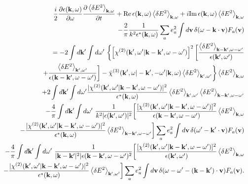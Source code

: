 \documentclass[10pt,aspectratio=1610,lualatex]{beamer}
\begin{document}
\begin{frame}\vspace{-0.6cm}
  \begin{eqnarray}
    &&\frac{i}{2}\frac{\partial \epsilon({\bf k},\omega)}{\partial \omega}
       \frac{\partial \left<\delta E^2\right>_{{\bf k},\omega}}{\partial t}
       +\mbox{Re}\,\epsilon({\bf k},\omega)\left<\delta E^2 \right>_{{\bf k},\omega}
       +i\mbox{Im}\,\epsilon({\bf k},\omega)\left<\delta E^2 \right>_{{\bf k},\omega}
       \nonumber\\
    &&\qquad \qquad \qquad -\frac{2}{\pi}\frac{1}{k^2\epsilon^*({\bf k},\omega)}
       \sum_a e_a^2\int d{\bf v}\,\delta(\omega-{\bf k\cdot v})F_a({\bf v})
       \nonumber\\
    &&=-2\int d{\bf k'} \int d\omega '\
       \biggl\{ \left[\chi^{(2)}({\bf k'},\omega '|{\bf k-k'},
       \omega-\omega ')\right]^2
       \biggl[\frac{\left<\delta E^2\right>_{{\bf k - k'},\omega-\omega '}}
       {\epsilon({\bf k'},\omega ')}
       \nonumber\\
    &&+\frac{\left<\delta E^2\right>_{{\bf k'},\omega '}}
       {\epsilon({\bf k - k'},\omega-\omega ')}\biggr]
       -\bar \chi^{(3)}({\bf k'},\omega|-{\bf k'},-\omega '|{\bf k},\omega)
       \left<\delta E^2\right>_{{\bf k'},\omega'}\biggr\}
       \left<\delta E^2\right>_{{\bf k},\omega}\nonumber\\
    &&+2\int d{\bf k'} \int d\omega '
       \frac{|\chi^{(2)}({\bf k'},\omega '|{\bf k-k'},\omega-\omega ')|^2}
       {\epsilon^*({\bf k},\omega)}
       \left<\delta E^2\right>_{{\bf k'},\omega '}
       \left<\delta E^2\right>_{{\bf k-k'},\omega-\omega '}
       \label{nlebe}\\
    &&-\frac{4}{\pi}\int d{\bf k '} \int d\omega '\
       \frac{1}{k^2|\epsilon({\bf k'},\omega ')|^2}
       \biggl[ \frac{[\chi^{(2)}({\bf k'},\omega '|{\bf k-k'},\omega-\omega ')]^2}
       {\epsilon({\bf k-k'},\omega-\omega ')}
       \left<\delta E^2 \right>_{{\bf k},\omega}
       \nonumber\\
    &&-\frac{|\chi^{(2)}({\bf k'},\omega '|{\bf k-k'},\omega-\omega ')|^2}
       {\epsilon^*({\bf k},\omega)}
       \left<\delta E^2 \right>_{{\bf k-k'},\omega-\omega '}\biggr]
       \sum_ae_a^2\int d{\bf v}\, \delta(\omega '-{\bf k' \cdot v})F_a({\bf v})
       \nonumber\\
    &&-\frac{4}{\pi}\int d{\bf k '} \int d\omega '\
       \frac{1}{|{\bf k - k'}|^2|\epsilon({\bf k-k'},\omega-\omega ')^2}
       \biggl[ \frac{[\chi^{(2)}({\bf k'},\omega '|{\bf k-k'},\omega-\omega ')]^2}
       {\epsilon({\bf k'},\omega ')}\left<\delta E^2 \right>_{{\bf k},\omega}
       \nonumber\\
    &&-\frac{|\chi^{(2)}({\bf k'},\omega '|{\bf k-k'},\omega-\omega ')|^2}
       {\epsilon^*({\bf k},\omega)}
       \left<\delta E^2 \right>_{{\bf k'},\omega '}\biggr]\sum_ae_a^2\int d{\bf v}\,
       \delta(\omega-\omega '-{\bf (k-k')\cdot v})F_a({\bf v}).
       \nonumber
  \end{eqnarray}
\end{frame}
\end{document}
